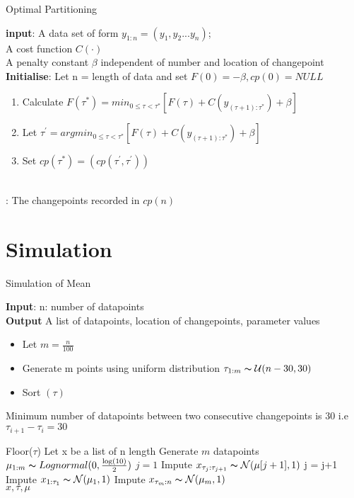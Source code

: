 \documentclass{article}
\newcommand\tab[1][0.4cm]{\hspace*{#1}}
\begin{document}
\begin{algorithm}
\caption{Optimal Partitioning}\label{alg:cap}

\textbf{input}: A data set of form $y_{1:n} = (y_{1},y_{2}...y_{n})$;\\
\qquad  A cost function $C(\cdot)$\\
\qquad A penalty constant $\beta$ independent of number and location of changepoint\\
\textbf{Initialise}: Let n = length of data and set $F(0) = -\beta, cp(0) = NULL$\\
\begin{algorithmic}
    \begin{enumerate}
        \item Calculate $F(\tau^{*}) = min_{0 \leq \tau < \tau^{*}} [F(\tau) + C(y_{(\tau+1) : \tau^{*}}) + \beta]$
        \item Let $\tau^{'} = argmin_{0 \leq \tau < \tau^{*}} [F(\tau) + C(y_{(\tau+1) : \tau^{*}}) + \beta]$
        \item Set $ cp(\tau^{*}) = (cp(\tau^{'} , \tau^{'}))$
    \end{enumerate}
\EndFor\\
\Return : The changepoints recorded in $cp(n)$ 
\end{algorithmic}
\end{algorithm}


\section{Simulation}

\begin{algorithm}
\caption{Simulation of Mean}\label{alg:cap}
\textbf{Input}: n: number of datapoints\\
\textbf{Output} A list of datapoints, location of changepoints, parameter values
\begin{algorithmic}
\begin{itemize}
    \item  Let $ m = \frac{n}{100}$
    \item  Generate m points using uniform distribution $\tau_{1:m} \thicksim \mathcal{U} (n-30,30)$ 
    \item  Sort $(\tau)$
\end{itemize}
     \Ensure Minimum number of datapoints between two consecutive changepoints \tab \tab \tab is 30 i.e $\tau_{i+1} - \tau_{i} = 30$ 

\State Floor($\tau$)
\State Let x be a list of n length
\State Generate $m$ datapoints $\mu_{1:m} \thicksim Lognormal(0,\frac{\log(10)}{2})$
\State $j = 1$
    \State Impute  $x_{\tau_{j} : \tau_{j+1}} \thicksim \mathcal{N}(\mu[j+1],1)$
    \State j = j+1
\EndWhile
\State Impute $x_{1:\tau_{1}} \thicksim \mathcal{N}(\mu_{1},1)$
\State Impute $x_{\tau_{m}:n} \thicksim \mathcal{N}(\mu_{m},1)$ \\
\Return $x,\tau,\mu$
\end{algorithmic}
\end{algorithm}
\end{document}
